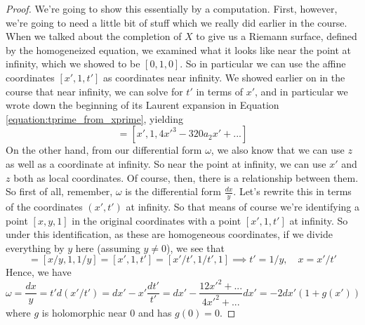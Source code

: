 \documentclass{article}
\begin{document}
\begin{proof}
We're going to show this essentially by a computation. First, however, we're going to need a little bit of stuff which we really did earlier in the course. When we talked about the completion of \(X\) to give us a Riemann surface, defined by the homogeneized equation, we examined what it looks like near the point at infinity, which we showed to be \([0, 1, 0]\). So in particular we can use the affine coordinates \([x', 1, t']\) as coordinates near infinity. We showed earlier on in the course that near infinity, we can solve for \(t'\) in terms of \(x'\), and in particular we wrote down the beginning of its Laurent expansion in Equation \ref{equation:tprime_from_xprime}, yielding
\begin{equation}
  [x', 1, z'] = [x', 1, 4x'^3 - 320a_2x' + ...]
\end{equation}
On the other hand, from our differential form \(\omega\), we also know that we can use \(z\) as well as a coordinate at infinity. So near the point at infinity, we can use \(x'\) and \(z\) both as local coordinates. Of course, then, there is a relationship between them. So first of all, remember, \(\omega\) is the differential form \(\frac{dx}{y}\). Let's rewrite this in terms of the coordinates \((x', t')\) at infinity. So that means of course we're identifying a point \([x, y, 1]\) in the original coordinates with a point \([x', 1, t']\) at infinity. So under this identification, as these are homogeneous coordinates, if we divide everything by \(y\) here (assuming \(y \neq 0\)), we see that
\begin{equation}
[x, y, 1] = [x/y, 1, 1/y] = [x', 1, t'] = [x'/t', 1/t', 1] \implies t' = 1/y, \quad x = x'/t'
\end{equation}
Hence, we have
\begin{equation}
  \omega = \frac{dx}{y} = t'd(x'/t') = dx' - x'\frac{dt'}{t'} = dx' - \frac{12x'^2 + ...}{4x'^2 + ...}dx' = -2dx'(1 + g(x'))
\end{equation}
where \(g\) is holomorphic near \(0\) and has \(g(0) = 0\).
\end{proof}
\end{document}
